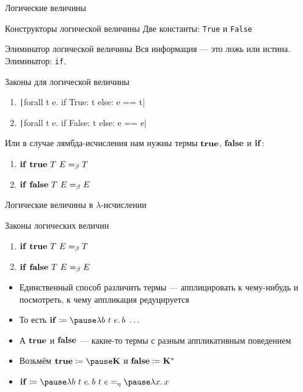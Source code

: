     \begin{frame}{Логические величины}
        \begin{block}{Конструкторы логической величины}
            \pause
            Две константы: \texttt{True} и \texttt{False}
        \end{block}
        \pause
        \begin{block}{Элиминатор логической величины}
            Вся информация --- это ложь или истина.
            Элиминатор: \pause \texttt{if}.
        \end{block} \pause
        \begin{block}{Законы для логической величины}
            \begin{enumerate}
                \item \pause \texttt|forall t e. if True: t else: e == t|
                \item \texttt|forall t e. if False: t else: e == e|
            \end{enumerate}
            \pause
            Или в случае лямбда-исчисления нам нужны термы \pause $\mathbf{true}$, $\mathbf{false}$ и $\mathbf{if}$:
            \begin{enumerate}
                \item $\mathbf{if} ~ \mathbf{true} ~ T ~ E =_\beta T$
                \item $\mathbf{if} ~ \mathbf{false} ~ T ~ E =_\beta E$
            \end{enumerate}
        \end{block}
    \end{frame}

    \begin{frame}{Логические величины в $\lambda$-исчислении}
        \begin{block}{Законы логических величин}
            \begin{enumerate}
                \item $\mathbf{if} ~ \mathbf{true} ~ T ~ E =_\beta T$
                \item $\mathbf{if} ~ \mathbf{false} ~ T ~ E =_\beta E$
            \end{enumerate}
        \end{block}
        \pause
        \begin{itemize}
            \item Единственный способ различить термы --- апплицировать к чему-нибудь и посмотреть, к чему аппликация редуцируется
            \item[\then] То есть $\term{if} \termdef \pause \lambda b~t~e \ldotp b \ap \ldots$
            \item \pause А $\mathbf{true}$ и $\mathbf{false}$ --- какие-то термы с разным аппликативным поведением
            \item[\then] Возьмём $\term{true} \termdef \pause \term{K}$ и $\mathbf{false} \coloneqq \mathbf{K}^*$
            \item[\then] \pause $\term{if} \termdef \pause \lambda b~t~e\ldotp b \ap t \ap e \eqeta \pause \lambda x\ldotp x$
        \end{itemize}
    \end{frame}

